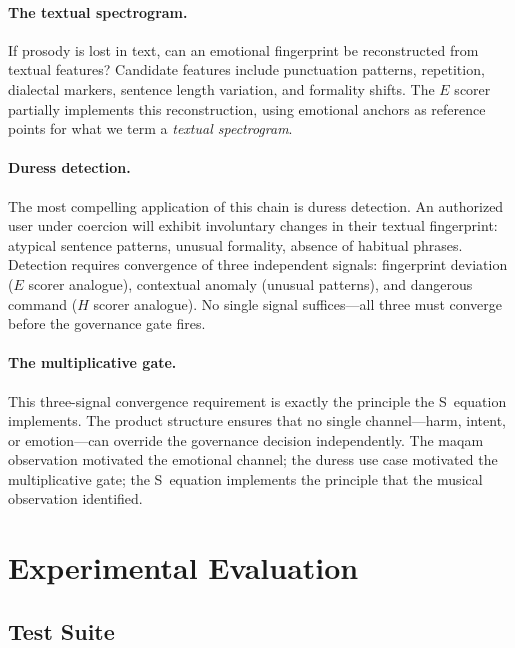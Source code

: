 \documentclass[11pt,a4paper]{article}
\begin{document}
\paragraph{The textual spectrogram.} If prosody is lost in text, can an emotional fingerprint be reconstructed from textual features? Candidate features include punctuation patterns, repetition, dialectal markers, sentence length variation, and formality shifts. The $E$ scorer partially implements this reconstruction, using emotional anchors as reference points for what we term a \emph{textual spectrogram}.

\paragraph{Duress detection.} The most compelling application of this chain is duress detection. An authorized user under coercion will exhibit involuntary changes in their textual fingerprint: atypical sentence patterns, unusual formality, absence of habitual phrases. Detection requires convergence of three independent signals: fingerprint deviation ($E$ scorer analogue), contextual anomaly (unusual patterns), and dangerous command ($H$ scorer analogue). No single signal suffices---all three must converge before the governance gate fires.

\paragraph{The multiplicative gate.} This three-signal convergence requirement is exactly the principle the S~equation implements. The product structure ensures that no single channel---harm, intent, or emotion---can override the governance decision independently. The maqam observation motivated the emotional channel; the duress use case motivated the multiplicative gate; the S~equation implements the principle that the musical observation identified.


\section{Experimental Evaluation}
\label{sec:experiments}

\subsection{Test Suite}
\end{document}
